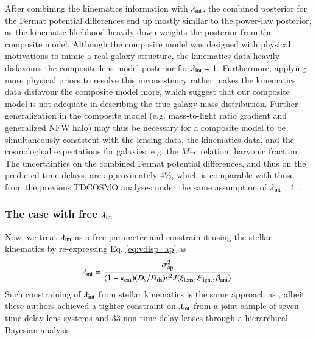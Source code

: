 \documentclass[longauth]{aa}
\newcommand{\Ds}{D_{\rm s}}
\newcommand{\Dds}{D_{\rm ds}}
\newcommand{\ajs}[1]{{{#1}}}
\begin{document}
After combining the kinematics information with $\lambda_{\rm int}$, the combined posterior for the Fermat potential differences end up mostly similar to the power-law posterior, as the kinematic likelihood heavily down-weights the posterior from the composite model. \ajs{Although the composite model was designed with physical motivations to mimic a real galaxy structure, the kinematics data heavily disfavours the composite lens model posterior for $\lambda_{\rm int} = 1$. Furthermore, applying more physical priors to resolve this inconsistency rather makes the kinematics data disfavour the composite model more, which suggest that our composite model is not adequate in describing the true galaxy mass distribution. Further generalization in the composite model (e.g. mass-to-light ratio gradient and generalized NFW halo) may thus be necessary for a composite model to be simultaneously consistent with the lensing data, the kinematics data, and the cosmological expectations for galaxies, e.g. the $M$--$c$ relation, baryonic fraction.} The uncertainties on the combined Fermat potential differences, and thus on the predicted time delays, are approximately 4\%, which is comparable with those from the previous TDCOSMO analyses under the same assumption of $\lambda_{\rm int} = 1$ \citep{Wong20}.

\subsubsection{The case with free $\lambda_{\rm int}$} \label{sec:lenstronomy_lambda_int_free}

Now, we treat $\lambda_{\rm int}$ as a free parameter and constrain it using the stellar kinematics by re-expressing Eq. \ref{eq:vdisp_ap} as
%
\begin{equation} \label{eq:lenstronomy_lambda_int}
        \lambda_{\rm int} = \frac{\sigma^2_{\rm ap}}{(1 - \kappa_{\rm ext}) (\Ds/\Dds) c^2 J(\xi_{\rm lens}, \xi_{\rm light}, \beta_{\rm ani})}.
\end{equation}
%
Such constraining of $\lambda_{\rm int}$ from stellar kinematics is the same approach as \citet[][TDCOSMO-IV]{Birrer20}, albeit these authors achieved a tighter constraint on $\lambda_{\rm int}$ from a joint sample of seven time-delay lens systems and 33 non-time-delay lenses through a hierarchical Bayesian analysis.
\end{document}
